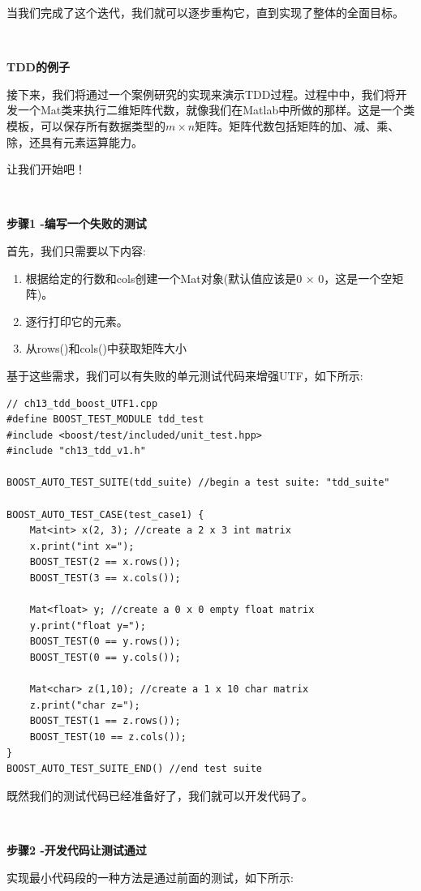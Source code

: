 当我们完成了这个迭代，我们就可以逐步重构它，直到实现了整体的全面目标。 \par

\noindent\textbf{}\ \par
\textbf{TDD的例子} \ \par
接下来，我们将通过一个案例研究的实现来演示TDD过程。过程中中，我们将开发一个Mat类来执行二维矩阵代数，就像我们在Matlab中所做的那样。这是一个类模板，可以保存所有数据类型的$ m × n $矩阵。矩阵代数包括矩阵的加、减、乘、除，还具有元素运算能力。 \par
让我们开始吧！ \par

\noindent\textbf{}\ \par
\textbf{步骤1 -编写一个失败的测试} \ \par
首先，我们只需要以下内容: \par
\begin{enumerate}
	\item 根据给定的行数和cols创建一个Mat对象(默认值应该是0 × 0，这是一个空矩阵)。
	\item 逐行打印它的元素。
	\item 从rows()和cols()中获取矩阵大小
\end{enumerate}

基于这些需求，我们可以有失败的单元测试代码来增强UTF，如下所示: \par

\begin{lstlisting}[caption={}]
// ch13_tdd_boost_UTF1.cpp
#define BOOST_TEST_MODULE tdd_test
#include <boost/test/included/unit_test.hpp>
#include "ch13_tdd_v1.h"

BOOST_AUTO_TEST_SUITE(tdd_suite) //begin a test suite: "tdd_suite"

BOOST_AUTO_TEST_CASE(test_case1) {
	Mat<int> x(2, 3); //create a 2 x 3 int matrix
	x.print("int x=");
	BOOST_TEST(2 == x.rows());
	BOOST_TEST(3 == x.cols());
	
	Mat<float> y; //create a 0 x 0 empty float matrix
	y.print("float y=");
	BOOST_TEST(0 == y.rows());
	BOOST_TEST(0 == y.cols());
	
	Mat<char> z(1,10); //create a 1 x 10 char matrix
	z.print("char z=");
	BOOST_TEST(1 == z.rows());
	BOOST_TEST(10 == z.cols());
}
BOOST_AUTO_TEST_SUITE_END() //end test suite
\end{lstlisting}

既然我们的测试代码已经准备好了，我们就可以开发代码了。 \par

\noindent\textbf{}\ \par
\textbf{步骤2 -开发代码让测试通过} \ \par
实现最小代码段的一种方法是通过前面的测试，如下所示: \par


